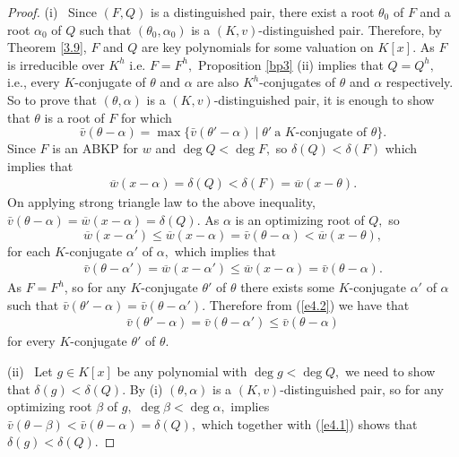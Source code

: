 \documentclass[11pt]{amsart}
\theoremstyle{definition}
\theoremstyle{remark}
\numberwithin{equation}{section}
\begin{document}
		\begin{proof}
		\noindent (i)~ Since $(F,Q)$ is a distinguished pair, there exist a root $\theta_0$ of $F$ and a root $\alpha_0$ of $Q$ such that $(\theta_0,\alpha_0)$ is a $(K,v)$-distinguished pair. Therefore, by Theorem \ref{3.9}, $F$ and $Q$ are key polynomials for some valuation on $K[x].$ As  $F$ is irreducible over $K^h$  i.e. $F=F^h,$ Proposition \ref{bp3} (ii) implies that $Q=Q^h,$ i.e., every $K$-conjugate of $\theta$ and $\alpha$ are also $K^h$-conjugates of $\theta$ and $\alpha$ respectively. So to prove that $(\theta,\alpha)$ is a  $(K,v)$-distinguished pair,  it is enough to show that $\theta$ is a root of $F$ for which \[\bar{v}(\theta-\alpha)=\max\{\bar{v}(\theta'-\alpha)\mid \theta' ~\text{a $K$-conjugate of $\theta$}\}.\]  Since $F$ is  an ABKP for $w$ and $\deg Q<\deg F,$ so $\delta(Q)<\delta(F)$ which  implies that 
		\begin{align}\label{e4.1}
		\overline{w}(x-\alpha)=\delta(Q)<\delta(F)=\overline{w}(x-\theta).	
		\end{align}
		On applying strong triangle law to the  above inequality,  $\bar{v}(\theta-\alpha)=\overline{w}(x-\alpha)=\delta(Q).$  As $\alpha$ is an optimizing root of $Q,$ so
		$$\overline{w}(x-\alpha')\leq \overline{w}(x-\alpha)=\bar{v}(\theta-\alpha)<\overline{w}(x-\theta),$$
		for each $K$-conjugate $\alpha'$ of $\alpha,$ which  implies that
		\begin{align}\label{e4.2}
			\bar{v}(\theta-\alpha')=\overline{w}(x-\alpha')\leq\overline{w}(x-\alpha)=\bar{v}(\theta-\alpha).
		\end{align}
		As $F=F^h$, so for any $K$-conjugate $\theta'$ of $\theta$ there exists some $K$-conjugate $\alpha'$ of $\alpha$ such that $\bar{v}(\theta'-\alpha)=\bar{v}(\theta-\alpha').$ Therefore from  (\ref{e4.2}) we have that 
		\begin{align*}
			\bar{v}(\theta'-\alpha)=\bar{v}(\theta-\alpha')\leq\bar{v}(\theta-\alpha)
		\end{align*}
		for every $K$-conjugate $\theta'$ of $\theta.$
		
		\noindent (ii)~ Let $g\in K[x]$ be any polynomial with $\deg g<\deg Q,$ we need to show that $\delta(g)<\delta(Q).$ By (i) $(\theta,\alpha)$ is a $(K,v)$-distinguished pair, so for any optimizing root $\beta$ of $g,$  $\deg\beta<\deg\alpha,$  implies
		$\bar{v}(\theta-\beta)<\bar{v}(\theta-\alpha)=\delta(Q),$ which together with (\ref{e4.1}) shows that $\delta(g)<\delta(Q).$
		\end{proof}
	
\end{document}
